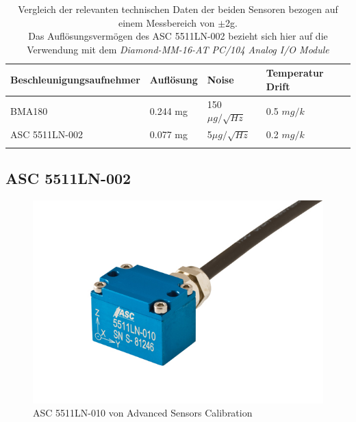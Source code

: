 \documentclass[12pt,a4paper]{scrartcl}
\begin{document}
\begin{table}[ht]
\begin{tabular}{@{}llll@{}}    
      			\cmidrule(r){1-4}\morecmidrules\cmidrule(r){1-4}
       			Beschleunigungsaufnehmer & Auflösung & Noise & Temperatur Drift\\
      			\midrule
 			BMA180 				   & 0.244 mg  & 150$\mu g / \sqrt{Hz}$ & 0.5 $mg/k$ \\ 
 			ASC 5511LN-002 		   & 0.077 mg  &    5$\mu g / \sqrt{Hz}$  & 0.2 $mg/k$\\
 		
   			\addlinespace
   			\bottomrule
 \end{tabular}
 \caption{Vergleich der relevanten technischen Daten der beiden Sensoren bezogen auf einem Messbereich von $\pm$2g.\\ Das Auflösungsvermögen des ASC 5511LN-002 bezieht sich hier auf die Verwendung mit  dem \textit{Diamond-MM-16-AT PC/104 Analog I/O Module}}
 \label{sensorcompare}
\end{table}

\subsection{ASC 5511LN-002}

\begin{figure}[H]
\centering
\includegraphics[scale=.5]{hardwareimages/asc.jpg}
\caption{ASC 5511LN-010 von Advanced Sensors Calibration}
\label{asc5511}
\end{figure}
\end{document}

